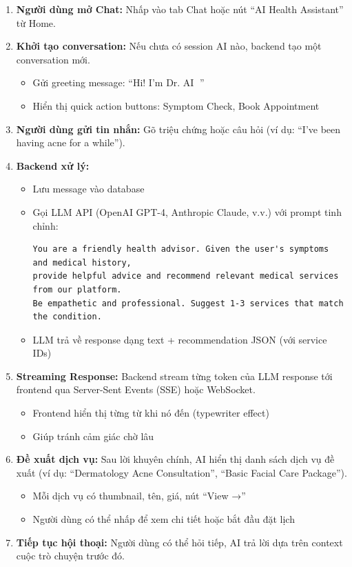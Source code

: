 \begin{enumerate}
    \item \textbf{Người dùng mở Chat:} Nhấp vào tab Chat hoặc nút ``AI Health Assistant'' từ Home.
    
    \item \textbf{Khởi tạo conversation:} Nếu chưa có session AI nào, backend tạo một conversation mới.
    \begin{itemize}
        \item Gửi greeting message: ``Hi! I'm Dr. AI 👋''
        \item Hiển thị quick action buttons: Symptom Check, Book Appointment
    \end{itemize}
    
    \item \textbf{Người dùng gửi tin nhắn:} Gõ triệu chứng hoặc câu hỏi (ví dụ: ``I've been having acne for a while'').
    
    \item \textbf{Backend xử lý:}
    \begin{itemize}
        \item Lưu message vào database
        \item Gọi LLM API (OpenAI GPT-4, Anthropic Claude, v.v.) với prompt tinh chỉnh:
        \begin{verbatim}
You are a friendly health advisor. Given the user's symptoms and medical history,
provide helpful advice and recommend relevant medical services from our platform.
Be empathetic and professional. Suggest 1-3 services that match the condition.
        \end{verbatim}
        \item LLM trả về response dạng text + recommendation JSON (với service IDs)
    \end{itemize}
    
    \item \textbf{Streaming Response:} Backend stream từng token của LLM response tới frontend qua Server-Sent Events (SSE) hoặc WebSocket.
    \begin{itemize}
        \item Frontend hiển thị từng từ khi nó đến (typewriter effect)
        \item Giúp tránh cảm giác chờ lâu
    \end{itemize}
    
    \item \textbf{Đề xuất dịch vụ:} Sau lời khuyên chính, AI hiển thị danh sách dịch vụ đề xuất (ví dụ: ``Dermatology Acne Consultation'', ``Basic Facial Care Package'').
    \begin{itemize}
        \item Mỗi dịch vụ có thumbnail, tên, giá, nút ``View →''
        \item Người dùng có thể nhấp để xem chi tiết hoặc bắt đầu đặt lịch
    \end{itemize}
    
    \item \textbf{Tiếp tục hội thoại:} Người dùng có thể hỏi tiếp, AI trả lời dựa trên context cuộc trò chuyện trước đó.
\end{enumerate}

